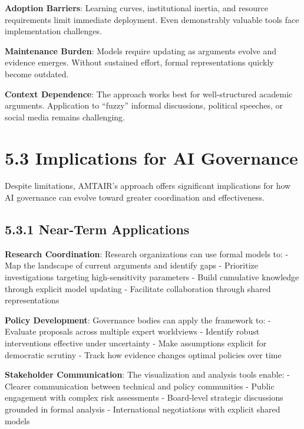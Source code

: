 \documentclass[
  11pt,
  letterpaper,
]{book}
\begin{document}
\textbf{Adoption Barriers}: Learning curves, institutional inertia, and
resource requirements limit immediate deployment. Even demonstrably
valuable tools face implementation challenges.

\textbf{Maintenance Burden}: Models require updating as arguments evolve
and evidence emerges. Without sustained effort, formal representations
quickly become outdated.

\textbf{Context Dependence}: The approach works best for well-structured
academic arguments. Application to ``fuzzy'' informal discussions,
political speeches, or social media remains challenging.

\section*{5.3 Implications for AI
Governance}\label{sec-governance-implications}


Despite limitations, AMTAIR's approach offers significant implications
for how AI governance can evolve toward greater coordination and
effectiveness.

\subsection*{5.3.1 Near-Term
Applications}\label{sec-near-term-applications}

\textbf{Research Coordination}: Research organizations can use formal
models to: - Map the landscape of current arguments and identify gaps -
Prioritize investigations targeting high-sensitivity parameters - Build
cumulative knowledge through explicit model updating - Facilitate
collaboration through shared representations

\textbf{Policy Development}: Governance bodies can apply the framework
to: - Evaluate proposals across multiple expert worldviews - Identify
robust interventions effective under uncertainty - Make assumptions
explicit for democratic scrutiny - Track how evidence changes optimal
policies over time

\textbf{Stakeholder Communication}: The visualization and analysis tools
enable: - Clearer communication between technical and policy communities
- Public engagement with complex risk assessments - Board-level
strategic discussions grounded in formal analysis - International
negotiations with explicit shared models
\end{document}
